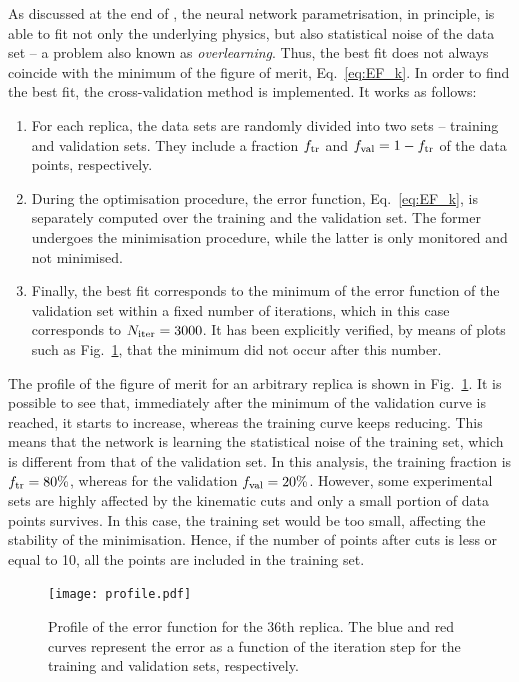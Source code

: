 As discussed at the end of , the neural network parametrisation, in principle, is able to fit not only the underlying physics, but also statistical noise of the data set -- a problem also known as \textit{overlearning}. Thus, the best fit does not always coincide with the minimum of the figure of merit, Eq.~\eqref{eq:EF_k}. In order to find the best fit, the cross-validation method \cite{pml1Book} is implemented. It works as follows:
\begin{enumerate}
  \item For each replica, the data sets are randomly divided into two sets -- training and validation sets. They include a fraction $f_{\textrm{tr}}$ and $f_{\textrm{val}} = 1 - f_{\textrm{tr}}$ of the data points, respectively.
  \item During the optimisation procedure, the error function, Eq.~\eqref{eq:EF_k}, is separately computed over the training and the validation set. The former undergoes the minimisation procedure, while the latter is only monitored and not minimised.
  \item Finally, the best fit corresponds to the minimum of the error function of the validation set within a fixed number of iterations, which in this case corresponds to $N_{\textrm{iter}} = 3000$. It has been explicitly verified, by means of plots such as Fig.~\ref{fig:profile}, that the minimum did not occur after this number.
\end{enumerate}
The profile of the figure of merit for an arbitrary replica is shown in Fig.~\ref{fig:profile}. It is possible to see that, immediately after the minimum of the validation curve is reached, it starts to increase, whereas the training curve keeps reducing. This means that the network is learning the statistical noise of the training set, which is different from that of the validation set. In this analysis, the training fraction is $f_{\textrm{tr}} = 80\%$, whereas for the validation $f_{\textrm{val}} = 20\%$. However, some experimental sets are highly affected by the kinematic cuts and only a small portion of data points survives. In this case, the training set would be too small, affecting the stability of the minimisation. Hence, if the number of points after cuts is less or equal to 10, all the points are included in the training set.

\begin{figure}[t]
  \centering
  \texttt{[image: profile.pdf]} 
  \caption{\small{Profile of the error function for the 36th replica. The blue and red curves represent the error as a function of the iteration step for the training and validation sets, respectively.}}
  \label{fig:profile}
\end{figure}

